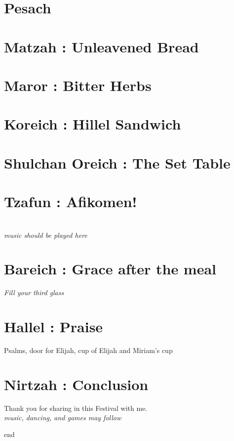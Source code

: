 \documentclass[a5paper,10pt]{memoir}
\begin{document}
\section{Pesach}

\section{Matzah : Unleavened Bread}
\HaMotzi
\Matzah

\section{Maror : Bitter Herbs}
\Maror

\section{Koreich : Hillel Sandwich}
\Koreich

\section{Shulchan Oreich : The Set Table}

\section{Tzafun : Afikomen!}
\\
\textit{music should be played here}

\section{Bareich : Grace after the meal}
\textit{Fill your third glass}\\
\Bareich
\Kaddeish

\section{Hallel : Praise}
Psalms, door for Elijah, cup of Elijah and Miriam’s cup

\Hallel
\Elijah
\Miriam
% 

\section{Nirtzah : Conclusion}
\Nirtzah
% 
Thank you for sharing in this Festival with me.\\
\textit{music, dancing, and games may follow}
\begin{center}
	{end}
\end{center}
\end{document}
